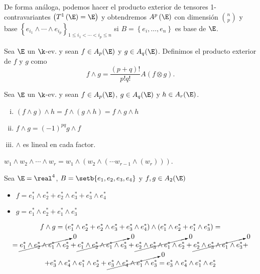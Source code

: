 \begin{obs}
    De forma análoga, podemos hacer el producto exterior de tensores 1-contravariantes $\left( T^1 \left( \E \right) = \E \right)$
    y obtendremos $A^p\left( \E \right)$ con dimensión $\binom{n}{p}$ y base \break $\left\{ e_{i_1}
    \wedge \cdots \wedge e_{i_p} \right\}_{1 \leq i_1 < \cdots < i_p \leq n}$ si $B=\left\{e_i, \dots , e_n\right\}$ es base de $\E$.
\end{obs}

\begin{defi}
    Sea $\E$ un $\k$-ev. y sean $f \in A_p(\E)$ y $g \in A_q(\E)$. Definimos el
    producto exterior de $f$ y $g$ como
    \[
        f \wedge g = \frac{(p+q)!}{p!q!}A(f \otimes g).
    \]
\end{defi}
\begin{prop}
    Sea $\E$ un $\k$-ev. y sean $f \in A_p(\E)$, $g \in A_q(\E)$ y $h \in A_r(\E)$.
    \begin{enumerate}[i)]
        \item $(f \wedge g) \wedge h = f \wedge (g \wedge h) = f \wedge g \wedge h$
        \item $f \wedge g = (-1)^{pq} g \wedge f$
        \item $\wedge$ es lineal en cada factor.
    \end{enumerate}
\end{prop}
\begin{obs}
    $w_1 \wedge w_2 \wedge \cdots \wedge w_r = w_1 \wedge (w_2 \wedge (
    \cdots w_{r-1} \wedge (w_r)))$.
\end{obs}
\begin{example}
    Sea $\E = \real ^4$, $B = \setb{e_1,e_2,e_3,e_4}$ y $f,g \in A_2(\E)$
    \begin{itemize}
        \item $f = e_1^* \wedge e_2^* + e_2^* \wedge e_3^* + e_3^* \wedge e_4^*$
        \item $g = e_1^* \wedge e_2^* + e_1^* \wedge e_3^*$
    \end{itemize}
    \begin{gather*}
        f \wedge g = (e_1^* \wedge e_2^* + e_2^* \wedge e_3^* + e_3^* \wedge e_4^*)
        \wedge (e_1^* \wedge e_2^* + e_1^* \wedge e_3^*) = \\
         = \cancelto{0}{e_1^* \wedge e_2^* \wedge e_1^* \wedge e_2^*} +
         \cancelto{0}{e_1^* \wedge e_2^* \wedge e_1^* \wedge e_3^*} +
         \cancelto{0}{e_2^* \wedge e_3^* \wedge e_1^* \wedge e_2^*} +
         \cancelto{0}{e_2^* \wedge e_3^* \wedge e_1^* \wedge e_3^*} + \\
         + e_3^* \wedge e_4^* \wedge e_1^* \wedge e_2^* +
         \cancelto{0}{e_3^* \wedge e_4^* \wedge e_1^* \wedge e_3^*} =
         e_3^* \wedge e_4^* \wedge e_1^* \wedge e_2^*
    \end{gather*}
\end{example}
